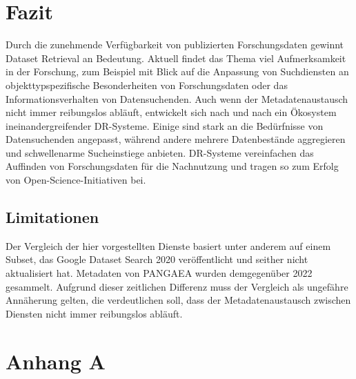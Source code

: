 \documentclass[a4paper,
fontsize=11pt,
oneside,
numbers=noperiodatend,
parskip=half-,
bibliography=totoc,
final
]{scrartcl}
\begin{document}
\hypertarget{fazit}{%
\section{Fazit}\label{fazit}}

Durch die zunehmende Verfügbarkeit von publizierten Forschungsdaten
gewinnt Dataset Retrieval an Bedeutung. Aktuell findet das Thema viel
Aufmerksamkeit in der Forschung, zum Beispiel mit Blick auf die
Anpassung von Suchdiensten an objekttypspezifische Besonderheiten von
Forschungsdaten oder das Informationsverhalten von Datensuchenden. Auch
wenn der Metadatenaustausch nicht immer reibungslos abläuft, entwickelt
sich nach und nach ein Ökosystem ineinandergreifender DR-Systeme. Einige
sind stark an die Bedürfnisse von Datensuchenden angepasst, während
andere mehrere Datenbestände aggregieren und schwellenarme Sucheinstiege
anbieten. DR-Systeme vereinfachen das Auffinden von Forschungsdaten für
die Nachnutzung und tragen so zum Erfolg von Open-Science-Initiativen
bei.

\hypertarget{limitationen}{%
\subsection{Limitationen}\label{limitationen}}

Der Vergleich der hier vorgestellten Dienste basiert unter anderem auf
einem Subset, das Google Dataset Search 2020 veröffentlicht und seither
nicht aktualisiert hat. Metadaten von PANGAEA wurden demgegenüber 2022
gesammelt. Aufgrund dieser zeitlichen Differenz muss der Vergleich als
ungefähre Annäherung gelten, die verdeutlichen soll, dass der
Metadatenaustausch zwischen Diensten nicht immer reibungslos abläuft.

\pagebreak

\hypertarget{anhang-a}{%
\section{Anhang A}\label{anhang-a}}
\end{document}
